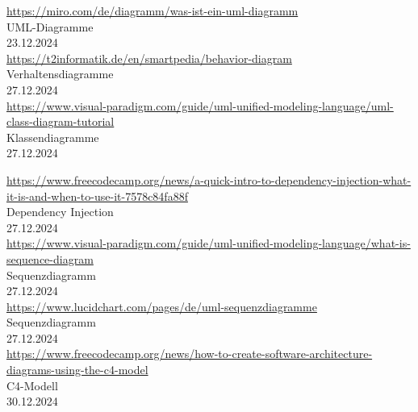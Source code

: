 \begin{thebibliography}{999}
    \href{https://miro.com/de/diagramm/was-ist-ein-uml-diagramm}{https://miro.com/de/diagramm/was-ist-ein-uml-diagramm} \\
    UML-Diagramme \\
    23.12.2024 \\

    \href{https://t2informatik.de/en/smartpedia/behavior-diagram}{https://t2informatik.de/en/smartpedia/behavior-diagram} \\
    Verhaltensdiagramme \\
    27.12.2024 \\

    \href{https://www.visual-paradigm.com/guide/uml-unified-modeling-language/uml-class-diagram-tutorial}{https://www.visual-paradigm.com/guide/uml-unified-modeling-language/uml-class-diagram-tutorial} \\
    Klassendiagramme \\
    27.12.2024 \\

    \clearpage

    \href{https://www.freecodecamp.org/news/a-quick-intro-to-dependency-injection-what-it-is-and-when-to-use-it-7578c84fa88f}{https://www.freecodecamp.org/news/a-quick-intro-to-dependency-injection-what-it-is-and-when-to-use-it-7578c84fa88f} \\
    Dependency Injection \\
    27.12.2024 \\

    \href{https://www.visual-paradigm.com/guide/uml-unified-modeling-language/what-is-sequence-diagram}{https://www.visual-paradigm.com/guide/uml-unified-modeling-language/what-is-sequence-diagram} \\
    Sequenzdiagramm \\
    27.12.2024 \\

    \href{https://www.lucidchart.com/pages/de/uml-sequenzdiagramme}{https://www.lucidchart.com/pages/de/uml-sequenzdiagramme} \\
    Sequenzdiagramm \\
    27.12.2024 \\

    \href{https://www.freecodecamp.org/news/how-to-create-software-architecture-diagrams-using-the-c4-model}{https://www.freecodecamp.org/news/how-to-create-software-architecture-diagrams-using-the-c4-model} \\
    C4-Modell \\
    30.12.2024 \\


\end{thebibliography}

